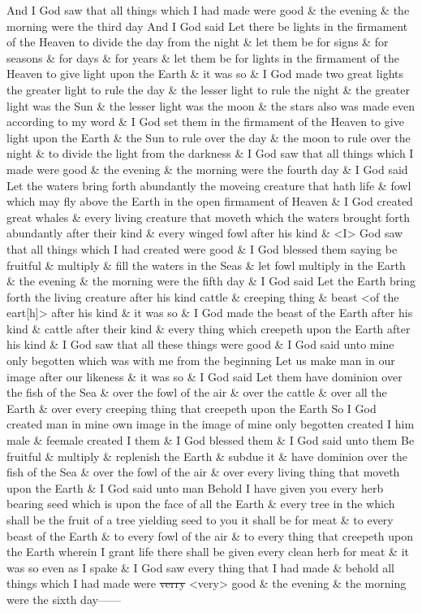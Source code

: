 		And I God saw that all things which I had made were good \& the evening \& the morning were the third day And I God said Let there be lights in the firmament of the Heaven to divide the day from the night \& let them be for signs \& for seasons \& for days \& for years \& let them be for lights in the firmament of the Heaven to give light upon the Earth \& it was so \& I God made two great lights the greater light to rule the day \& the lesser light to rule the night \& the greater light was the Sun \& the lesser light was the moon \& the stars also was made even according to my word \& I God set them in the firmament of the Heaven to give light upon the Earth \& the Sun to rule over the day \& the moon to rule over the night \& to divide the light from the darkness \& I God saw that all things which I made were good \& the evening \& the morning were the fourth day \& I God said Let the waters bring forth abundantly the moveing creature that hath life \& fowl which may fly above the Earth in the open firmament of Heaven \& I God created great whales \& every living creature that moveth which the waters brought forth abundantly after their kind \& every winged fowl after his kind \& <I> God saw that all things which I had created were good \& I God blessed them saying be fruitful \& multiply \& fill the waters in the Seas \& let fowl multiply in the Earth \& the evening \& the morning were the fifth day \& I God said Let the Earth bring forth the living creature after his kind cattle \& creeping thing \& beast <of the eart[h]> after his kind \& it was so \& I God made the beast of the Earth after his kind \& cattle after their kind \& every thing which creepeth upon the Earth after his kind \& I God saw that all these things were good \& I God said unto mine only begotten which was with me from the beginning Let us make man in our image after our likeness \& it was so \& I God said Let them have dominion over the fish of the Sea \& over the fowl of the air \& over the cattle \& over all the Earth \& over every creeping thing that creepeth upon the Earth So I God created man in mine own image in the image of mine only begotten created I him male \& feemale created I them \& I God blessed them \& I God said unto them Be fruitful \& multiply \& replenish the Earth \& subdue it \& have dominion over the fish of the Sea \& over the fowl of the air \& over every living thing that moveth upon the Earth \& I God said unto man Behold I have given you every herb bearing seed which is upon the face of all the Earth \& every tree in the which shall be the fruit of a tree yielding seed to you it shall be for meat \& to every beast of the Earth \& to every fowl of the air \& to every thing that creepeth upon the Earth wherein I grant life there shall be given every clean herb for meat \& it was so even as I spake \& I God saw every thing that I had made \& behold all things which I had made were \sout{verry} <very> good \& the evening \& the morning were the sixth day------
		
